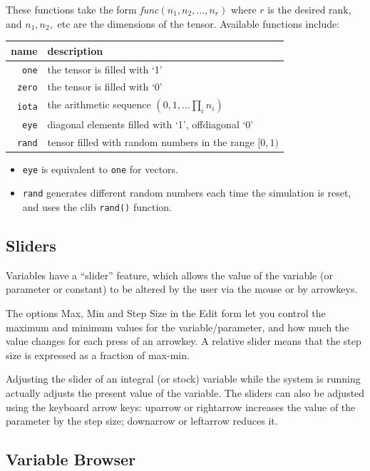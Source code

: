 These functions take the form {\em func}$(n_{1},n_{2},\ldots,n_{r})$
where $r$ is the desired rank, and $n_{1},n_{2},$ etc are the dimensions
of the tensor. Available functions include:

\begin{tabular}{|r|l|}
\hline 
name  & description\tabularnewline
\hline 
\verb+one+ & the tensor is filled with `1'\tabularnewline
\verb+zero+ & the tensor is filled with `0'\tabularnewline
\verb+iota+ & the arithmetic sequence $(0,1,...\prod_{i}n_{i})$\tabularnewline
\verb+eye+ & diagonal elements filled with `1', offdiagonal `0'\tabularnewline
\verb+rand+ & tensor filled with random numbers in the range $[0,1)$\tabularnewline
\hline 
\end{tabular}
\begin{itemize}
\item \verb+eye+ is equivalent to \verb+one+ for vectors. 
\item \verb+rand+ generates different random numbers each time the simulation
is reset, and uses the clib \verb+rand()+ function. 
\end{itemize}

\subsection{Sliders}

Variables have a ``slider'' feature, which allows the value of the
variable (or parameter or constant) to be altered by the user via
the mouse or by arrowkeys.

The options Max, Min and Step Size in the Edit form let you control
the maximum and minimum values for the variable/parameter, and how
much the value changes for each press of an arrowkey. A relative slider
means that the step size is expressed as a fraction of max-min.

Adjusting the slider of an integral (or stock) variable while the
system is running actually adjusts the present value of the variable.
The sliders can also be adjusted using the keyboard arrow keys: uparrow
\textuparrow{} or rightarrow \textrightarrow{} increases the value
of the parameter by the step size; downarrow \textdownarrow or leftarrow
\textleftarrow{} reduces it.

\subsection{Variable Browser}

